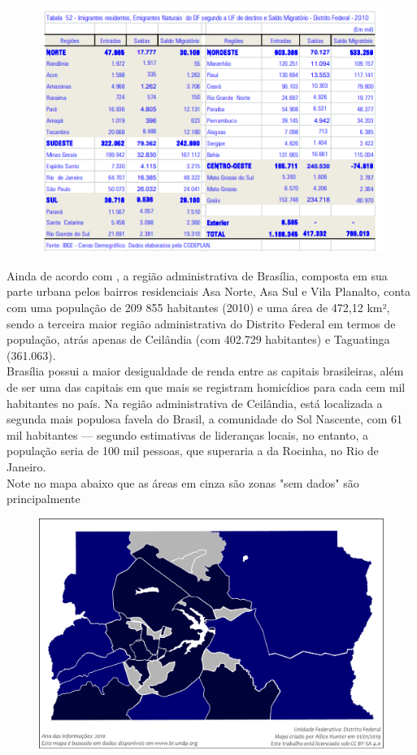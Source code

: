 \begin{figure}
    \centering
    \includegraphics{fig/imigrantes-2010}
    \caption{}
    \label{fig:imigrantes-2010}
\end{figure}


Ainda de acordo com , a região administrativa de Brasília, composta em sua parte urbana pelos bairros residenciais Asa Norte, Asa Sul e Vila Planalto, conta com uma população de 209 855 habitantes (2010) e uma área de 472,12 km², sendo a terceira maior região administrativa do Distrito Federal em termos de população, atrás apenas de Ceilândia (com 402.729 habitantes) e Taguatinga (361.063).\\

Brasília possui a maior desigualdade de renda entre as capitais brasileiras, além de ser uma das capitais em que mais se registram homicídios para cada cem mil habitantes no país. Na região administrativa de Ceilândia, está localizada a segunda mais populosa favela do Brasil, a comunidade do Sol Nascente, com 61 mil habitantes — segundo estimativas de lideranças locais, no entanto, a população seria de 100 mil pessoas, que superaria a da Rocinha, no Rio de Janeiro.\\

Note no mapa abaixo que as áreas em cinza são zonas "sem dados" são principalmente
\begin{figure}
    \centering
    \includegraphics{2-caps/cap02/Mapa_do_IDH_do_Distrito_Federal_(2010)}
    \caption{}
    \label{fig:mapadoidhdodistritofederal2010}
\end{figure}

